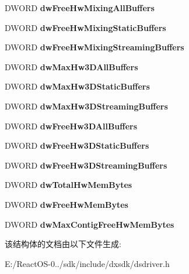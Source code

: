 \begin{DoxyCompactItemize}
D\+W\+O\+RD {\bfseries dw\+Free\+Hw\+Mixing\+All\+Buffers}
\item 
\mbox{\label{struct___d_s_d_r_i_v_e_r_c_a_p_s_a911747524513f310da93e17f05f09ff1}} 
D\+W\+O\+RD {\bfseries dw\+Free\+Hw\+Mixing\+Static\+Buffers}
\item 
\mbox{\label{struct___d_s_d_r_i_v_e_r_c_a_p_s_afbc40844849ee70d285675a620b53384}} 
D\+W\+O\+RD {\bfseries dw\+Free\+Hw\+Mixing\+Streaming\+Buffers}
\item 
\mbox{\label{struct___d_s_d_r_i_v_e_r_c_a_p_s_a9d565a346049894e60e4e9de764a4ae3}} 
D\+W\+O\+RD {\bfseries dw\+Max\+Hw3\+D\+All\+Buffers}
\item 
\mbox{\label{struct___d_s_d_r_i_v_e_r_c_a_p_s_aeb4fc30d68a1fe444c426f1240b96a9d}} 
D\+W\+O\+RD {\bfseries dw\+Max\+Hw3\+D\+Static\+Buffers}
\item 
\mbox{\label{struct___d_s_d_r_i_v_e_r_c_a_p_s_ac125dd7c6fbb50ad3accdc8506b5cb5a}} 
D\+W\+O\+RD {\bfseries dw\+Max\+Hw3\+D\+Streaming\+Buffers}
\item 
\mbox{\label{struct___d_s_d_r_i_v_e_r_c_a_p_s_ad96d1fe98de4a118d00b4d4f90e9e17f}} 
D\+W\+O\+RD {\bfseries dw\+Free\+Hw3\+D\+All\+Buffers}
\item 
\mbox{\label{struct___d_s_d_r_i_v_e_r_c_a_p_s_aa5a3ed3674ff8c7d61e8cb14f0a22548}} 
D\+W\+O\+RD {\bfseries dw\+Free\+Hw3\+D\+Static\+Buffers}
\item 
\mbox{\label{struct___d_s_d_r_i_v_e_r_c_a_p_s_aebe4b14665a949fd7e3acf90a6b93305}} 
D\+W\+O\+RD {\bfseries dw\+Free\+Hw3\+D\+Streaming\+Buffers}
\item 
\mbox{\label{struct___d_s_d_r_i_v_e_r_c_a_p_s_a2a3240820e44cecc68433250a0e8b932}} 
D\+W\+O\+RD {\bfseries dw\+Total\+Hw\+Mem\+Bytes}
\item 
\mbox{\label{struct___d_s_d_r_i_v_e_r_c_a_p_s_ac8456e3f1af8154db319c99d39a4f59b}} 
D\+W\+O\+RD {\bfseries dw\+Free\+Hw\+Mem\+Bytes}
\item 
\mbox{\label{struct___d_s_d_r_i_v_e_r_c_a_p_s_a28d410aeb3dcde24f256056ea351c760}} 
D\+W\+O\+RD {\bfseries dw\+Max\+Contig\+Free\+Hw\+Mem\+Bytes}
\end{DoxyCompactItemize}


该结构体的文档由以下文件生成\+:\begin{DoxyCompactItemize}
\item 
E\+:/\+React\+O\+S-\/0../sdk/include/dxsdk/dsdriver.\+h\end{DoxyCompactItemize}
